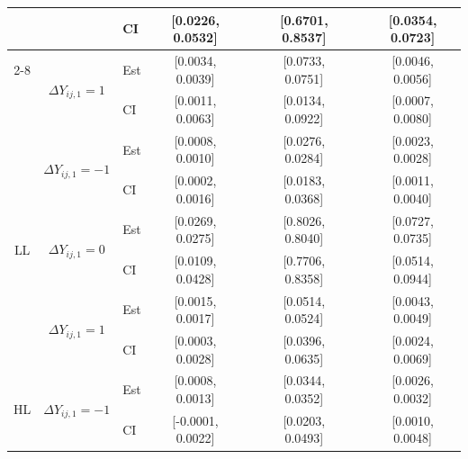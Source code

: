 \documentclass[12pt]{article}
\theoremstyle{definition}
\begin{document}
\begin{table}[htbp]
\begin{tabular}{cclccccc}
          &       & CI    & \textcolor[rgb]{ .188,  .329,  .588}{[0.0226, 0.0532]} &       & [0.6701, 0.8537] &       & \textcolor[rgb]{ .753,  0,  0}{[0.0354, 0.0723]} \\
\cmidrule{2-8}          & \multirow{2}[2]{*}{$\Delta Y_{ij,1} = 1$} & Est   & \textcolor[rgb]{ .188,  .329,  .588}{[0.0034, 0.0039]} &       & \textcolor[rgb]{ .188,  .329,  .588}{[0.0733, 0.0751]} &       & [0.0046, 0.0056] \\
          &       & CI    & \textcolor[rgb]{ .188,  .329,  .588}{[0.0011, 0.0063]} &       & \textcolor[rgb]{ .188,  .329,  .588}{[0.0134, 0.0922]} &       & [0.0007, 0.0080] \\
    \midrule
    \multirow{6}[6]{*}{LL} & \multirow{2}[2]{*}{$\Delta Y_{ij,1} = -1$} & Est   & [0.0008, 0.0010] &       & \textcolor[rgb]{ .753,  0,  0}{[0.0276, 0.0284]} &       & \textcolor[rgb]{ .753,  0,  0}{[0.0023, 0.0028]} \\
          &       & CI    & [0.0002, 0.0016] &       & \textcolor[rgb]{ .753,  0,  0}{[0.0183, 0.0368]} &       & \textcolor[rgb]{ .753,  0,  0}{[0.0011, 0.0040]} \\
\cmidrule{2-8}          & \multirow{2}[2]{*}{$\Delta Y_{ij,1} = 0$} & Est   & \textcolor[rgb]{ .188,  .329,  .588}{[0.0269, 0.0275]} &       & [0.8026, 0.8040] &       & \textcolor[rgb]{ .753,  0,  0}{[0.0727, 0.0735]} \\
          &       & CI    & \textcolor[rgb]{ .188,  .329,  .588}{[0.0109, 0.0428]} &       & [0.7706, 0.8358] &       & \textcolor[rgb]{ .753,  0,  0}{[0.0514, 0.0944]} \\
\cmidrule{2-8}          & \multirow{2}[2]{*}{$\Delta Y_{ij,1} = 1$} & Est   & \textcolor[rgb]{ .188,  .329,  .588}{[0.0015, 0.0017]} &       & \textcolor[rgb]{ .188,  .329,  .588}{[0.0514, 0.0524]} &       & [0.0043, 0.0049] \\
          &       & CI    & \textcolor[rgb]{ .188,  .329,  .588}{[0.0003, 0.0028]} &       & \textcolor[rgb]{ .188,  .329,  .588}{[0.0396, 0.0635]} &       & [0.0024, 0.0069] \\
    \midrule
    \multirow{6}[6]{*}{HL} & \multirow{2}[2]{*}{$\Delta Y_{ij,1} = -1$} & Est   & [0.0008, 0.0013] &       & \textcolor[rgb]{ .753,  0,  0}{[0.0344, 0.0352]} &       & \textcolor[rgb]{ .753,  0,  0}{[0.0026, 0.0032]} \\
          &       & CI    & [-0.0001, 0.0022] &       & \textcolor[rgb]{ .753,  0,  0}{[0.0203, 0.0493]} &       & \textcolor[rgb]{ .753,  0,  0}{[0.0010, 0.0048]} \\

\end{tabular}
\end{table}
\end{document}
